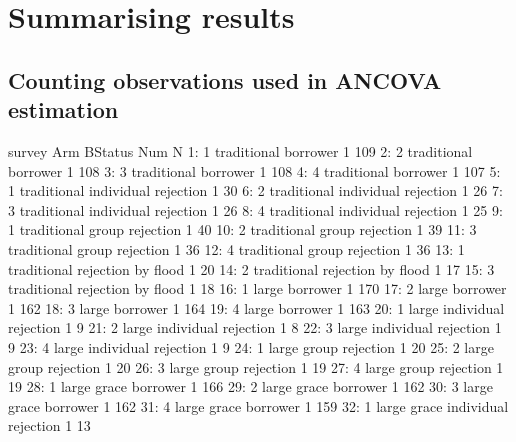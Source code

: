 


\section{Summarising results}


\subsection{Counting observations used in ANCOVA estimation}

\begin{Schunk}
\begin{Soutput}
    survey         Arm              BStatus Num   N
 1:      1 traditional             borrower   1 109
 2:      2 traditional             borrower   1 108
 3:      3 traditional             borrower   1 108
 4:      4 traditional             borrower   1 107
 5:      1 traditional individual rejection   1  30
 6:      2 traditional individual rejection   1  26
 7:      3 traditional individual rejection   1  26
 8:      4 traditional individual rejection   1  25
 9:      1 traditional      group rejection   1  40
10:      2 traditional      group rejection   1  39
11:      3 traditional      group rejection   1  36
12:      4 traditional      group rejection   1  36
13:      1 traditional   rejection by flood   1  20
14:      2 traditional   rejection by flood   1  17
15:      3 traditional   rejection by flood   1  18
16:      1       large             borrower   1 170
17:      2       large             borrower   1 162
18:      3       large             borrower   1 164
19:      4       large             borrower   1 163
20:      1       large individual rejection   1   9
21:      2       large individual rejection   1   8
22:      3       large individual rejection   1   9
23:      4       large individual rejection   1   9
24:      1       large      group rejection   1  20
25:      2       large      group rejection   1  20
26:      3       large      group rejection   1  19
27:      4       large      group rejection   1  19
28:      1 large grace             borrower   1 166
29:      2 large grace             borrower   1 162
30:      3 large grace             borrower   1 162
31:      4 large grace             borrower   1 159
32:      1 large grace individual rejection   1  13

\end{Soutput}
\end{Schunk}
